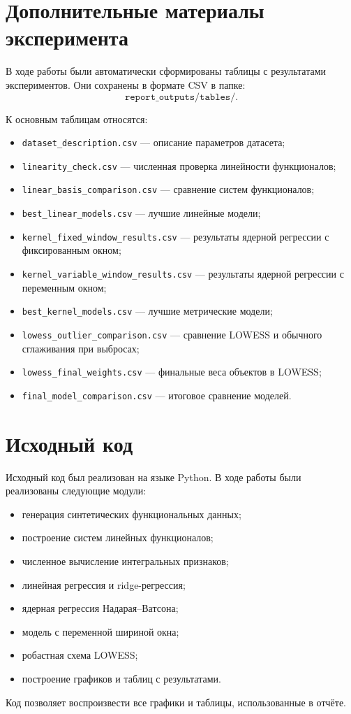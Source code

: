 \documentclass[14pt,a4paper]{extarticle}
\begin{document}
\newpage


\appendix

\section{Дополнительные материалы эксперимента}

В ходе работы были автоматически сформированы таблицы с результатами экспериментов. Они сохранены в формате CSV в папке:
\[
\texttt{report\_outputs/tables/}.
\]

К основным таблицам относятся:
\begin{itemize}
    \item \texttt{dataset\_description.csv} — описание параметров датасета;
    \item \texttt{linearity\_check.csv} — численная проверка линейности функционалов;
    \item \texttt{linear\_basis\_comparison.csv} — сравнение систем функционалов;
    \item \texttt{best\_linear\_models.csv} — лучшие линейные модели;
    \item \texttt{kernel\_fixed\_window\_results.csv} — результаты ядерной регрессии с фиксированным окном;
    \item \texttt{kernel\_variable\_window\_results.csv} — результаты ядерной регрессии с переменным окном;
    \item \texttt{best\_kernel\_models.csv} — лучшие метрические модели;
    \item \texttt{lowess\_outlier\_comparison.csv} — сравнение LOWESS и обычного сглаживания при выбросах;
    \item \texttt{lowess\_final\_weights.csv} — финальные веса объектов в LOWESS;
    \item \texttt{final\_model\_comparison.csv} — итоговое сравнение моделей.
\end{itemize}

\section{Исходный код}

Исходный код был реализован на языке Python. В ходе работы были реализованы следующие модули:
\begin{itemize}
    \item генерация синтетических функциональных данных;
    \item построение систем линейных функционалов;
    \item численное вычисление интегральных признаков;
    \item линейная регрессия и ridge-регрессия;
    \item ядерная регрессия Надарая--Ватсона;
    \item модель с переменной шириной окна;
    \item робастная схема LOWESS;
    \item построение графиков и таблиц с результатами.
\end{itemize}

Код позволяет воспроизвести все графики и таблицы, использованные в отчёте.
\end{document}
